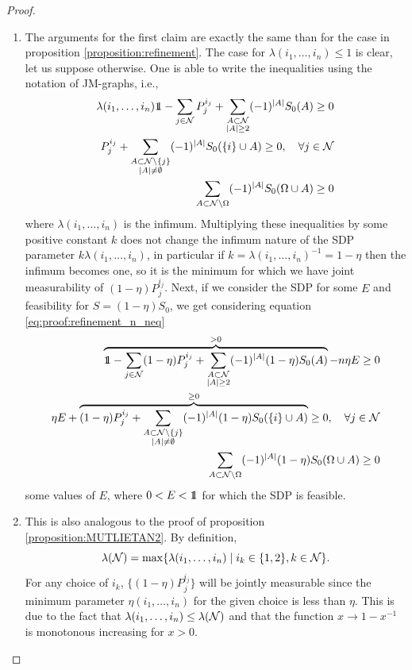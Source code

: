 \documentclass[10pt, a4paper]{amsart}
\begin{document}
\begin{proof}
\begin{enumerate}
\item The arguments for the first claim are exactly the same than for the case in proposition \ref{proposition:refinement}. The case for $\lambda ( i_{1}, \ldots, i_{n}) \leq 1$ is clear, let us suppose otherwise. One is able to write the inequalities using the notation of JM-graphs, i.e., 
\begin{align*}
\lambda(i_{1}, \ldots, i_{n}) \bbone  -\sum_{j\in \N} P_{j}^{i_{j}}  + \sum\limits_{\substack{A\subset \N\\|A| \geq 2}}
(-1)^{|A|}S_{0}(A)\geq 0 \\
P_{j}^{i_{j}} + \sum_{\substack{A\subset \N\backslash \{j\}\\|A| \neq \emptyset}}
(-1)^{|A|}S_{0}(\{i\}\cup A)\geq 0, \quad \forall j \in \N\\
\sum_{A\subset \N\backslash \Omega}
(-1)^{|A|}S_{0}(\Omega\cup A)\geq 0 
\end{align*}
where $\lambda(i_{1}, \ldots , i_{n})$ is the infimum. Multiplying these inequalities by some positive constant $k$ does not change the infimum nature of the SDP parameter $k\lambda(i_{1}, \ldots , i_{n})$, in particular if $k = \lambda(i_{1}, \ldots , i_{n})^{-1} = 1-\eta$ then the infimum becomes one, so it is the minimum for which we have joint measurability of $(1-\eta)P_{j}^{i_{j}}$. Next, if we consider the SDP for some $E$ and feasibility for $S = (1-\eta) S_{0}$, we get considering equation \ref{eq:proof:refinement_n_neq} 
\begin{align*}
\overbrace{\bbone  -\sum_{j\in \N} (1-\eta)P_{j}^{i_{j}}  + \sum\limits_{\substack{A\subset \N\\|A| \geq 2}}
(-1)^{|A|}(1-\eta)S_{0}(A)}^{>0} - n\eta E\geq 0  \\
\eta E  + \overbrace{(1-\eta)P_{j}^{i_{j}} + \sum_{\substack{A\subset \N\backslash \{j\}\\|A| \neq \emptyset}}
(-1)^{|A|}(1-\eta)S_{0}(\{i\}\cup A)}^{\geq 0}\geq 0, \quad \forall j \in \N\\
\sum_{A\subset \N\backslash \Omega}
(-1)^{|A|}(1-\eta)S_{0}(\Omega\cup A)\geq 0 
\end{align*}
some values of $E$, where $0< E<\bbone$ for which the SDP is feasible. 
\item This is also analogous to the proof of proposition \ref{proposition:MUTLIETAN2}. By definition, 
$$
\lambda (\mathcal{N}) = \max\{\lambda(i_{1}, \ldots , i_{n}) \mid i_{k}\in \{1,2\}, k\in\mathcal{N}\}. 
$$
For any choice of $i_{k}$, $\{(1-\eta)P_{j}^{i_{j}}\}$ will be jointly measurable since the minimum parameter $\eta ( i_{1}, \ldots, i_{n})$ for the given choice is less than $\eta$. This is due to the fact that $\lambda ( i_{1} , \ldots , i_{n}) \leq \lambda (\mathcal{N}) $ and that the function $x\to 1-x^{-1}$ is monotonous increasing for $x>0$. 
\end{enumerate}




\end{proof}
\end{document}
